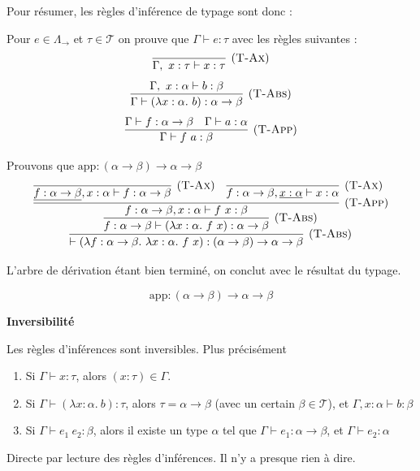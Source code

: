 \documentclass[11pt]{article}
\begin{document}
Pour résumer, les règles d'inférence de typage sont donc :
\begin{definition}
    Pour $e\in\Lambda_\rightarrow$ et $\tau\in\mathcal{T}$ on prouve que $\Gamma\vdash e:\tau$ avec les règles suivantes :
    $$
    \infer[(\text{\scshape{T-Ax}})] 
    {\Gamma,~x:\tau\vdash x:\tau}{}
    $$
    $$
    \infer[(\text{\scshape{T-Abs}})]
    {\Gamma\vdash(\lambda x:\alpha.~b):\alpha\to\beta}
    {\Gamma,~x:\alpha\vdash b:\beta}
    $$
    $$
    \infer[(\text{\scshape{T-App}})]
    {\Gamma \vdash f~a:\beta}
    {\Gamma\vdash f:\alpha\to\beta & \Gamma\vdash a:\alpha}
    $$
\end{definition}

\begin{example}
    Prouvons que $\text{app}:(\alpha\to\beta)\to\alpha\to\beta$
    $$
    \infer[(\text{\scshape{T-Abs}})]
    {
        \vdash(\lambda f:\alpha\to\beta.~\lambda x:\alpha.~f~x):(\alpha\to\beta)\to\alpha\to\beta
    }
    {
        \infer[(\text{\scshape{T-Abs}})]
        {
            f:\alpha\to\beta\vdash(\lambda x:\alpha.~f~x):\alpha\to\beta
        }
        {
            \infer[(\text{\scshape{T-App}})]
            {
                f:\alpha\to\beta, x: \alpha\vdash f~x:\beta
            }
            {
                \infer[(\text{\scshape{T-Ax}})]
                {\underline{f:\alpha\to\beta}, x: \alpha\vdash f:\alpha\to\beta}
                {}
                &
                \infer[(\text{\scshape{T-Ax}})]
                {f:\alpha\to\beta, \underline{x: \alpha}\vdash x:\alpha}
                {}
            }
        }
    }
    $$

    L'arbre de dérivation étant bien terminé, on conclut avec le résultat du typage.

    $$\text{app}:(\alpha\to\beta)\to\alpha\to\beta$$
\end{example}

\begin{theorem}
    \textbf{Inversibilité}

    Les règles d'inférences sont inversibles. Plus précisément
    \begin{enumerate}
        \item Si $\Gamma \vdash x:\tau$, alors $(x:\tau)\in\Gamma$.
        \item Si $\Gamma \vdash (\lambda x:\alpha.~b):\tau$, alors $\tau=\alpha\to\beta$ (avec un certain $\beta\in\mathcal{T}$), et $\Gamma, x:\alpha\vdash b:\beta$
        \item Si $\Gamma\vdash e_1~e_2:\beta$, alors il existe un type $\alpha$ tel que $\Gamma\vdash e_1:\alpha\to\beta$, et $\Gamma\vdash e_2:\alpha$
    \end{enumerate}

    \begin{preuve}
        Directe par lecture des règles d'inférences. Il n'y a presque rien à dire.
    \end{preuve}
\end{theorem}
\end{document}
